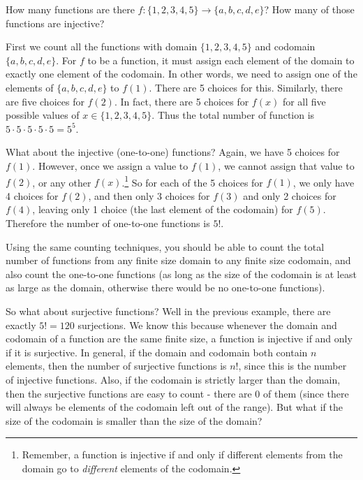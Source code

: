 \documentclass[12pt]{article}
\begin{document}
\begin{example}
  How many functions are there $f: \{1,2,3,4,5\} \to \{a,b,c,d,e\}$?  How many of those functions are injective? 
  \begin{solution}
    First we count all the functions with domain $\{1,2,3,4,5\}$ and codomain $\{a,b,c,d,e\}$.  For $f$ to be a function, it must assign each element of the domain to exactly one element of the codomain.  In other words, we need to assign one of the elements of $\{a,b,c,d,e\}$ to $f(1)$.  There are 5 choices for this.  Similarly, there are five choices for $f(2)$.  In fact, there are 5 choices for $f(x)$ for all five possible values of $x \in \{1,2,3,4,5\}$.  Thus the total number of function is $5 \cdot 5 \cdot 5 \cdot 5 \cdot 5 = 5^5$.
    
    What about the injective (one-to-one) functions?  Again, we have 5 choices for $f(1)$.  However, once we assign a value to $f(1)$, we cannot assign that value to $f(2)$, or any other $f(x)$.\footnote{Remember, a function is injective if and only if different elements from the domain go to {\em different} elements of the codomain.} So for each of the 5 choices for $f(1)$, we only have 4 choices for $f(2)$, and then only 3 choices for $f(3)$ and only 2 choices for $f(4)$, leaving only 1 choice (the last element of the codomain) for $f(5)$.  Therefore the number of one-to-one functions is $5!$.
  \end{solution}

\end{example}

Using the same counting techniques, you should be able to count the total number of functions from any finite size domain to any finite size codomain, and also count the one-to-one functions (as long as the size of the codomain is at least as large as the domain, otherwise there would be no one-to-one functions).

So what about surjective functions?  Well in the previous example, there are exactly $5! = 120$ surjections.  We know this because whenever the domain and codomain of a function are the same finite size, a function is injective if and only if it is surjective.  In general, if the domain and codomain both contain $n$ elements, then the number of surjective functions is $n!$, since this is the number of injective functions.  Also, if the codomain is strictly larger than the domain, then the surjective functions are easy to count - there are 0 of them (since there will always be elements of the codomain left out of the range).  But what if the size of the codomain is smaller than the size of the domain?
\end{document}

